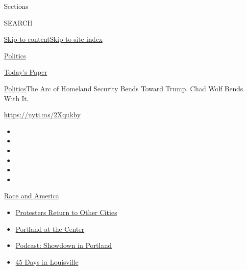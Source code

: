 Sections

SEARCH

\protect\hyperlink{site-content}{Skip to
content}\protect\hyperlink{site-index}{Skip to site index}

\href{https://www.nytimes3xbfgragh.onion/section/politics}{Politics}

\href{https://myaccount.nytimes3xbfgragh.onion/auth/login?response_type=cookie\&client_id=vi}{}

\href{https://www.nytimes3xbfgragh.onion/section/todayspaper}{Today's
Paper}

\href{/section/politics}{Politics}\textbar{}The Arc of Homeland Security
Bends Toward Trump. Chad Wolf Bends With It.

\url{https://nyti.ms/2Xqukby}

\begin{itemize}
\item
\item
\item
\item
\item
\item
\end{itemize}

\href{https://www.nytimes3xbfgragh.onion/news-event/george-floyd-protests-minneapolis-new-york-los-angeles?action=click\&pgtype=Article\&state=default\&region=TOP_BANNER\&context=storylines_menu}{Race
and America}

\begin{itemize}
\tightlist
\item
  \href{https://www.nytimes3xbfgragh.onion/2020/07/26/us/protests-portland-seattle-trump.html?action=click\&pgtype=Article\&state=default\&region=TOP_BANNER\&context=storylines_menu}{Protesters
  Return to Other Cities}
\item
  \href{https://www.nytimes3xbfgragh.onion/2020/07/24/us/portland-oregon-protests-white-race.html?action=click\&pgtype=Article\&state=default\&region=TOP_BANNER\&context=storylines_menu}{Portland
  at the Center}
\item
  \href{https://www.nytimes3xbfgragh.onion/2020/07/23/podcasts/the-daily/portland-protests.html?action=click\&pgtype=Article\&state=default\&region=TOP_BANNER\&context=storylines_menu}{Podcast:
  Showdown in Portland}
\item
  \href{https://www.nytimes3xbfgragh.onion/interactive/2020/07/16/us/black-lives-matter-protests-louisville-breonna-taylor.html?action=click\&pgtype=Article\&state=default\&region=TOP_BANNER\&context=storylines_menu}{45
  Days in Louisville}
\end{itemize}

